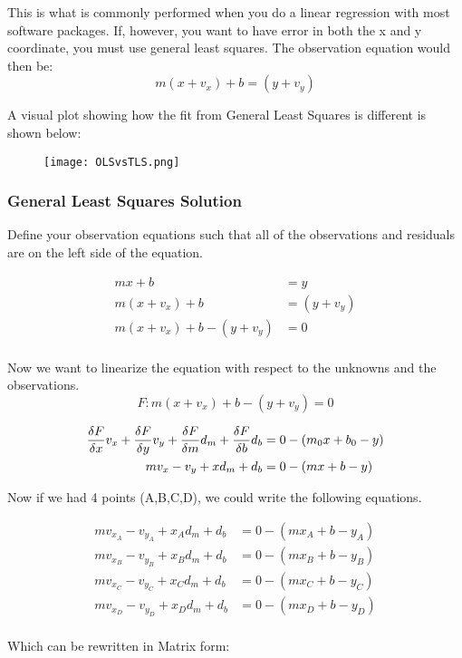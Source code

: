 This is what is commonly performed when you do a linear regression with most software packages.  If, however, you want to have error in both the x and y coordinate, you must use general least squares.  The observation equation would then be: 
\[
m(x+v_x) + b = (y + v_y)
\]

A visual plot showing how the fit from General Least Squares is different is shown below:
\begin{figure}[H]
	\centering
	\texttt{[image: OLSvsTLS.png]}
\end{figure}


\subsubsection*{General Least Squares Solution}
Define your observation equations such that all of the observations and residuals are on the left side of the equation.

\begin{align*}
mx + b &= y \\
m(x+v_x) + b &= (y+v_y) \\
m(x+v_x) + b - (y+v_y) &= 0 \\
\end{align*}

Now we want to linearize the equation with respect to the unknowns and the observations.  
\[
F: m(x+v_x) + b - (y+v_y) = 0
\]

\begin{align*}
\frac{\delta F}{\delta x}v_x + \frac{\delta F}{\delta y}v_y + \frac{\delta F}{\delta m}d_m + \frac{\delta F}{\delta b}d_b &= 0 - (m_0x+b_0-y) \\
mv_x -v_y + xd_m + d_b &= 0 - (mx+b-y) \\
\end{align*}

Now if we had 4 points (A,B,C,D), we could write the following equations.

\begin{align*}
mv_{x_A} -v_{y_A} + x_Ad_m + d_b &= 0 - (mx_A+b-y_A) \\
mv_{x_B} -v_{y_B} + x_Bd_m + d_b &= 0 - (mx_B+b-y_B) \\
mv_{x_C} -v_{y_C} + x_Cd_m + d_b &= 0 - (mx_C+b-y_C) \\
mv_{x_D} -v_{y_D} + x_Dd_m + d_b &= 0 - (mx_D+b-y_D) \\
\end{align*}

Which can be rewritten in Matrix form:

